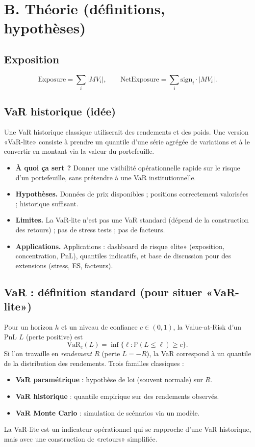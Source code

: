 \documentclass[11pt,a4paper]{report}
\theoremstyle{definition}
\theoremstyle{plain}
\theoremstyle{remark}
\newcommand{\Prob}{\mathbb{P}}
\newcommand{\1}{\mathbf{1}}
\newcommand{\qa}[4]{
\begin{itemize}[leftmargin=*]
\item \textbf{À quoi ça sert ?} #1
\item \textbf{Hypothèses.} #2
\item \textbf{Limites.} #3
\item \textbf{Applications.} #4
\end{itemize}
}
\begin{document}
\section{B. Théorie (définitions, hypothèses)}
\subsection*{Exposition}
\[
\text{Exposure}=\sum_i |MV_i|,\qquad
\text{NetExposure}=\sum_i \text{sign}_i\cdot |MV_i|.
\]
\subsection*{VaR historique (idée)}
Une VaR historique classique utiliserait des rendements et des poids. Une version «VaR-lite» consiste à prendre un quantile d'une série agrégée de variations et à le convertir en montant via la valeur du portefeuille.

\qa
{Donner une visibilité opérationnelle rapide sur le risque d'un portefeuille, sans prétendre à une VaR institutionnelle.}
{Données de prix disponibles ; positions correctement valorisées ; historique suffisant.}
{La VaR-lite n'est pas une VaR standard (dépend de la construction des retours) ; pas de stress tests ; pas de facteurs.}
{Applications : dashboard de risque «lite» (exposition, concentration, PnL), quantiles indicatifs, et base de discussion pour des extensions (stress, ES, facteurs).}

\subsection*{VaR : définition standard (pour situer «VaR-lite»)}
Pour un horizon $h$ et un niveau de confiance $c\in(0,1)$, la Value-at-Risk d'un PnL $L$ (perte positive) est
\[
\mathrm{VaR}_{c}(L)=\inf\{\ell:\Prob(L\le \ell)\ge c\}.
\]
Si l'on travaille en \emph{rendement} $R$ (perte $L=-R$), la VaR correspond à un quantile de la distribution des rendements.
Trois familles classiques :
\begin{itemize}[leftmargin=*]
\item \textbf{VaR paramétrique} : hypothèse de loi (souvent normale) sur $R$.
\item \textbf{VaR historique} : quantile empirique sur des rendements observés.
\item \textbf{VaR Monte Carlo} : simulation de scénarios via un modèle.
\end{itemize}
La VaR-lite est un indicateur opérationnel qui se rapproche d'une VaR historique, mais avec une construction de «retours» simplifiée.
\end{document}
